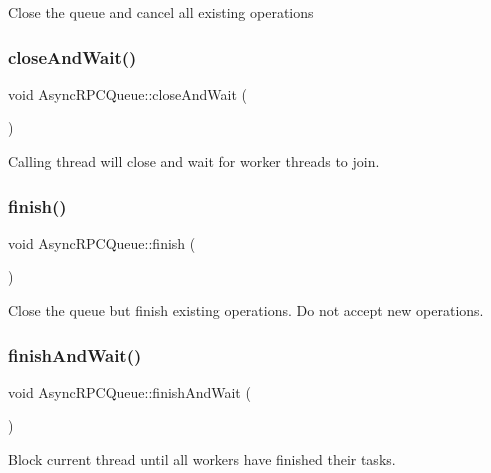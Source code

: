 Close the queue and cancel all existing operations \mbox{\label{class_async_r_p_c_queue_a1744ae79a6f3ac3cb98404f8a1489cd4}} 
\subsubsection{\texorpdfstring{close\+And\+Wait()}{closeAndWait()}}
{\footnotesize\ttfamily void Async\+R\+P\+C\+Queue\+::close\+And\+Wait (\begin{DoxyParamCaption}{ }\end{DoxyParamCaption})}

Calling thread will close and wait for worker threads to join. \mbox{\label{class_async_r_p_c_queue_acc9201529321a452826979ea11697b21}} 
\subsubsection{\texorpdfstring{finish()}{finish()}}
{\footnotesize\ttfamily void Async\+R\+P\+C\+Queue\+::finish (\begin{DoxyParamCaption}{ }\end{DoxyParamCaption})}

Close the queue but finish existing operations. Do not accept new operations. \mbox{\label{class_async_r_p_c_queue_aaa0414a23dee050656280306b9cf1589}} 
\subsubsection{\texorpdfstring{finish\+And\+Wait()}{finishAndWait()}}
{\footnotesize\ttfamily void Async\+R\+P\+C\+Queue\+::finish\+And\+Wait (\begin{DoxyParamCaption}{ }\end{DoxyParamCaption})}

Block current thread until all workers have finished their tasks. \mbox{\label{class_async_r_p_c_queue_abca893fa7d90594a7807548c15aa1020}} 
